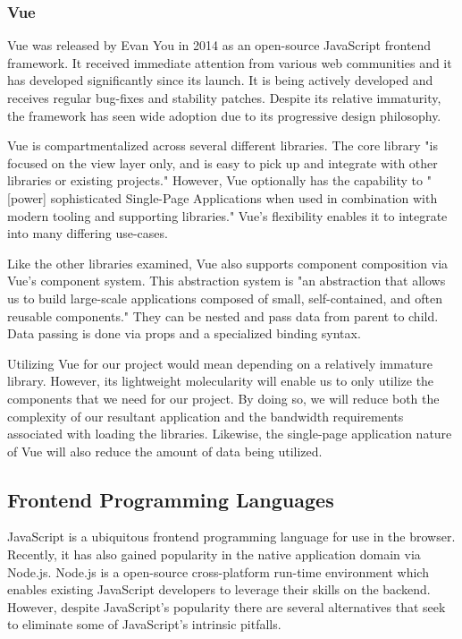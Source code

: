 \documentclass[12pt]{report}
\begin{document}
\subsubsection*{Vue}

Vue was released by Evan You in 2014 as an open-source JavaScript frontend framework.\cite{vuelaunch} It received immediate attention from various web communities and it has developed significantly since its launch. It is being actively developed and receives regular bug-fixes and stability patches. Despite its relative immaturity, the framework has seen wide adoption due to its progressive design philosophy.

Vue is compartmentalized across several different libraries. The core library "is focused on the view layer only, and is easy to pick up and integrate with other libraries or existing projects." \cite{vueguide} However, Vue optionally has the capability to "[power] sophisticated Single-Page Applications when used in combination with modern tooling and supporting libraries."\cite{vueguide} Vue's flexibility enables it to integrate into many differing use-cases.

Like the other libraries examined, Vue also supports component composition via Vue's component system. This abstraction system is "an abstraction that allows us to build large-scale applications composed of small, self-contained, and often reusable components."\cite{vueguide} They can be nested and pass data from parent to child. Data passing is done via props and a specialized binding syntax.

Utilizing Vue for our project would mean depending on a relatively immature library. However, its lightweight molecularity will enable us to only utilize the components that we need for our project. By doing so, we will reduce both the complexity of our resultant application and the bandwidth requirements associated with loading the libraries. Likewise, the single-page application nature of Vue will also reduce the amount of data being utilized.

\subsection*{Frontend Programming Languages}

JavaScript is a ubiquitous frontend programming language for use in the browser. Recently, it has also gained popularity in the native application domain via Node.js. Node.js is a open-source cross-platform run-time environment which enables existing JavaScript developers to leverage their skills on the backend. However, despite JavaScript's popularity there are several alternatives that seek to eliminate some of JavaScript's intrinsic pitfalls.
\end{document}

